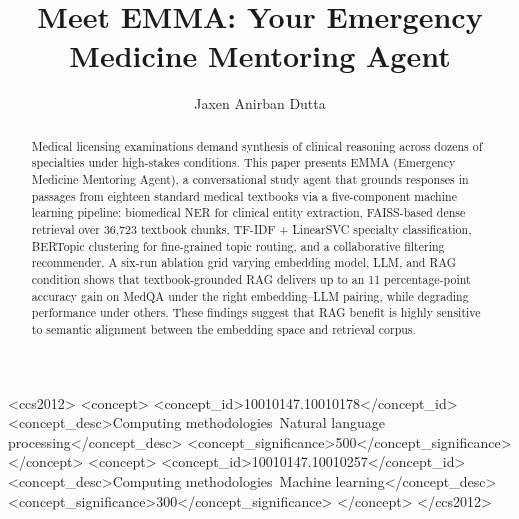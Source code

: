 \documentclass[sigplan,screen]{acmart}
\begin{document}
\title{Meet EMMA: Your Emergency Medicine Mentoring Agent}

\author{Jaxen Anirban Dutta}

\renewcommand{\shortauthors}{Dutta}

\begin{abstract}
Medical licensing examinations demand synthesis of clinical reasoning across dozens
of specialties under high-stakes conditions. This paper presents EMMA (Emergency
Medicine Mentoring Agent), a conversational study agent that grounds responses in
passages from eighteen standard medical textbooks via a five-component machine
learning pipeline: biomedical NER for clinical entity extraction, FAISS-based dense
retrieval over 36,723 textbook chunks, TF-IDF + LinearSVC specialty classification,
BERTopic clustering for fine-grained topic routing, and a collaborative filtering
recommender. A six-run ablation grid varying embedding model, LLM, and RAG
condition shows that textbook-grounded RAG delivers up to an 11 percentage-point
accuracy gain on MedQA under the right embedding--LLM pairing, while degrading
performance under others. These findings suggest that RAG benefit is highly
sensitive to semantic alignment between the embedding space and retrieval corpus.
\end{abstract}

\begin{CCSXML}
<ccs2012>
 <concept>
  <concept_id>10010147.10010178</concept_id>
  <concept_desc>Computing methodologies~Natural language processing</concept_desc>
  <concept_significance>500</concept_significance>
 </concept>
 <concept>
  <concept_id>10010147.10010257</concept_id>
  <concept_desc>Computing methodologies~Machine learning</concept_desc>
  <concept_significance>300</concept_significance>
 </concept>
</ccs2012>
\end{CCSXML}
\end{document}
